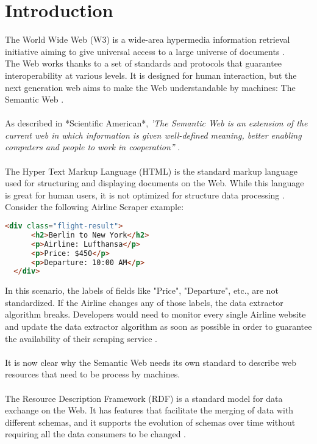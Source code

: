 \chapter{Introduction\label{cha:chapter1}}

The World Wide Web (W3) is a wide-area hypermedia information retrieval initiative aiming to give universal access to a large universe of documents \cite{www}.
\\
The Web works thanks to a set of standards and protocols that guarantee interoperability at various levels. 
It is designed for human interaction, but the next generation web aims to make the Web understandable by machines: The Semantic Web \cite{sematicWeb}.
\\
\\
As described in *Scientific American*, 
\textit{'The Semantic Web is an extension of the current web in which information is given well-defined meaning, better enabling computers and people to work in cooperation''} \cite{bernerslee2001semantic}.
\\
\\
The Hyper Text Markup Language (HTML) is the standard markup language used for structuring and displaying documents on the Web.
While this language is great for human users, it is not optimized for structure data processing \cite{herman2003semanticweb}. 
\\
Consider the following Airline Scraper example:
\begin{lstlisting}[language=HTML, caption={Example of HTML flight data from an Airline company}, label={lst:html-example}, frame=single]
  <div class="flight-result">
      <h2>Berlin to New York</h2>
      <p>Airline: Lufthansa</p>
      <p>Price: $450</p>
      <p>Departure: 10:00 AM</p>
  </div>
  \end{lstlisting}
In this scenario, the labels of fields like "Price", "Departure", etc., are not standardized. If the Airline changes any of those labels, the data extractor algorithm breaks. 
Developers would need to monitor every single Airline website and update the data extractor algorithm as soon as possible in order to guarantee the availability of their scraping service \cite{herman2003semanticweb}.
\\
\\
It is now clear why the Semantic Web needs its own standard to describe web resources that need to be process by machines.
\\
\\
The Resource Description Framework (RDF) is a standard model for data exchange on the Web. It has features that facilitate the merging of data with different schemas, and it supports the evolution of schemas over time without requiring all the data consumers to be changed \cite{rdf}.
